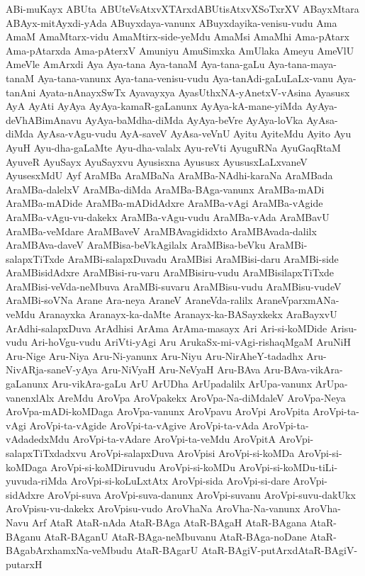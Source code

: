 {ABi-muKayx
ABUta
ABUteVsAtxvXTArxdABUtisAtxvXSoTxrXV
ABayxMtara
ABAyx-mitAyxdi-yAda
ABuyxdaya-vanunx
ABuyxdayika-venisu-vudu
Ama
AmaM
AmaMtarx-vidu
AmaMtirx-side-yeMdu
AmaMsi
AmaMhi
Ama-pAtarx
Ama-pAtarxda
Ama-pAterxV
Amuniyu
AmuSimxka
AmUlaka
Ameyu
AmeVlU
AmeVle
AmArxdi
Aya
Aya-tana
Aya-tanaM
Aya-tana-gaLu
Aya-tana-maya-tanaM
Aya-tana-vanunx
Aya-tana-venisu-vudu
Aya-tanAdi-gaLuLaLx-vanu
Aya-tanAni
Ayata-nAnayxSwTx
Ayavayxya
AyasUthxNA-yAnetxV-vAsina
Ayasusx
AyA
AyAti
AyAya
AyAya-kamaR-gaLanunx
AyAya-kA-mane-yiMda
AyAya-deVhABimAnavu
AyAya-baMdha-diMda
AyAya-beVre
AyAya-loVka
AyAsa-diMda
AyAsa-vAgu-vudu
AyA-saveV
AyAsa-veVnU
Ayitu
AyiteMdu
Ayito
Ayu
AyuH
Ayu-dha-gaLaMte
Ayu-dha-valalx
Ayu-reVti
AyuguRNa
AyuGaqRtaM
AyuveR
AyuSayx
AyuSayxvu
Ayusisxna
Ayususx
AyususxLaLxvaneV
AyusesxMdU
Ayf
AraMBa
AraMBaNa
AraMBa-NAdhi-karaNa
AraMBada
AraMBa-dalelxV
AraMBa-diMda
AraMBa-BAga-vanunx
AraMBa-mADi
AraMBa-mADide
AraMBa-mADidAdxre
AraMBa-vAgi
AraMBa-vAgide
AraMBa-vAgu-vu-dakekx
AraMBa-vAgu-vudu
AraMBa-vAda
AraMBavU
AraMBa-veMdare
AraMBaveV
AraMBAvagididxto
AraMBAvada-dalilx
AraMBAva-daveV
AraMBisa-beVkAgilalx
AraMBisa-beVku
AraMBi-salapxTiTxde
AraMBi-salapxDuvadu
AraMBisi
AraMBisi-daru
AraMBi-side
AraMBisidAdxre
AraMBisi-ru-varu
AraMBisiru-vudu
AraMBisilapxTiTxde
AraMBisi-veVda-neMbuva
AraMBi-suvaru
AraMBisu-vudu
AraMBisu-vudeV
AraMBi-soVNa
Arane
Ara-neya
AraneV
AraneVda-ralilx
AraneVparxmANa-veMdu
Aranayxka
Aranayx-ka-daMte
Aranayx-ka-BASayxkekx
AraBayxvU
ArAdhi-salapxDuva
ArAdhisi
ArAma
ArAma-masayx
Ari
Ari-si-koMDide
Arisu-vudu
Ari-hoVgu-vudu
AriVti-yAgi
Aru
ArukaSx-mi-vAgi-rishaqMgaM
AruNiH
Aru-Nige
Aru-Niya
Aru-Ni-yanunx
Aru-Niyu
Aru-NirAheY-tadadhx
Aru-NivARja-saneV-yAya
Aru-NiVyaH
Aru-NeVyaH
Aru-BAva
Aru-BAva-vikAra-gaLanunx
Aru-vikAra-gaLu
ArU
ArUDha
ArUpadalilx
ArUpa-vanunx
ArUpa-vanenxlAlx
AreMdu
AroVpa
AroVpakekx
AroVpa-Na-diMdaleV
AroVpa-Neya
AroVpa-mADi-koMDaga
AroVpa-vanunx
AroVpavu
AroVpi
AroVpita
AroVpi-ta-vAgi
AroVpi-ta-vAgide
AroVpi-ta-vAgive
AroVpi-ta-vAda
AroVpi-ta-vAdadedxMdu
AroVpi-ta-vAdare
AroVpi-ta-veMdu
AroVpitA
AroVpi-salapxTiTxdadxvu
AroVpi-salapxDuva
AroVpisi
AroVpi-si-koMDa
AroVpi-si-koMDaga
AroVpi-si-koMDiruvudu
AroVpi-si-koMDu
AroVpi-si-koMDu-tiLi-yuvuda-riMda
AroVpi-si-koLuLxtAtx
AroVpi-sida
AroVpi-si-dare
AroVpi-sidAdxre
AroVpi-suva
AroVpi-suva-danunx
AroVpi-suvanu
AroVpi-suvu-dakUkx
AroVpisu-vu-dakekx
AroVpisu-vudo
AroVhaNa
AroVha-Na-vanunx
AroVha-Navu
Arf
AtaR
AtaR-nAda
AtaR-BAga
AtaR-BAgaH
AtaR-BAgana
AtaR-BAganu
AtaR-BAganU
AtaR-BAga-neMbuvanu
AtaR-BAga-noDane
AtaR-BAgabArxhamxNa-veMbudu
AtaR-BAgarU
AtaR-BAgiV-putArxdAtaR-BAgiV-putarxH
}

